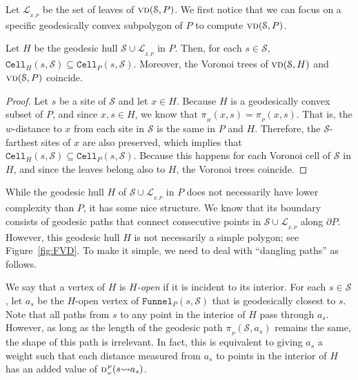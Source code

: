 \documentclass[a4paper,UKenglish]{socg-lipics-v2018}
\newcommand{\s}{\mathcal S}
\newcommand{\dd}[3][P]{\ensuremath{\textsc{d}_{\scriptscriptstyle w}^{\scriptscriptstyle #1}(#2 {\leadsto} #3)}}
\newcommand{\p}[3][P]{\ensuremath{\pi_{_{#1}}(#2, #3)}}
\newcommand{\funnel}[2][P]{\ensuremath{\mathtt{Funnel}_{\scriptscriptstyle #1}(#2)}}
\newcommand{\cell}[2][P]{\ensuremath{\mathtt{Cell}_{\scriptscriptstyle #1}(#2)}}
\newcommand{\vd}[2][P]{\textsc{vd}(#2, #1)}
\newcommand{\LL}[1][\s, P]{\ensuremath{\mathcal L_{_{#1}}}}
\begin{document}
Let $\LL$ be the set of leaves of $\vd{\s}$.
We first notice that we can focus on a specific geodesically convex subpolygon of $P$ to compute $\vd{\s}$.

\begin{lemma}\label{lemma:Voronoi coincides for geodesically convex subsets}
Let $H$ be the geodesic hull $\s\cup \LL$ in $P$.
Then, for each $s\in \s$, $\cell[H]{s, \s} \subseteq \cell{s, \s}$. Moreover, the Voronoi trees of $\vd[H]{\s}$ and $\vd{\s}$ coincide. 
\end{lemma}
\begin{proof}
Let $s$ be a site of $\s$ and let $x\in H$. 
Because $H$ is a geodesically convex subset of $P$, and since $x,s\in H$, we know that $\p[H]{x}{s} = \p{x}{s}$. 
That is, the $w$-distance to $x$ from each site in $\s$ is the same in $P$ and $H$. 
Therefore, the $\s$-farthest sites of $x$ are also preserved, which implies that $\cell[H]{s, \s} \subseteq \cell{s, \s}$. 
Because this happens for each Voronoi cell of $\s$ in $H$, and since the leaves belong also to $H$, the Voronoi trees coincide.
\end{proof}

While the geodesic hull $H$ of $\s\cup \LL$ in $P$ does not necessarily have lower complexity than $P$, it has some nice structure. 
We know that its boundary consists of geodesic paths that connect consecutive points in $\s\cup \LL$ along $\partial P$.
However, this geodesic hull $H$ is not necessarily a simple polygon; see Figure~\ref{fig:FVD}. 
To make it simple, we need to deal with ``dangling paths'' as follows.

We say that a vertex of $H$ is \emph{$H$-open} if it is incident to its interior.
For each $s\in \s$, let $a_s$ be the $H$-open vertex of $\funnel{s, \s}$ that is geodesically closest to $s$. 
Note that all paths from $s$ to any point in the interior of $H$ pass through $a_s$.
However, as long as the length of the geodesic path $\p{\s}{a_s}$ remains the same, the shape of this path is irrelevant. 
In fact, this is equivalent to giving $a_s$ a weight such that each distance measured from $a_s$ to points in the interior of $H$ has 
an added value of $\dd{s}{a_s}$. 
\end{document}
